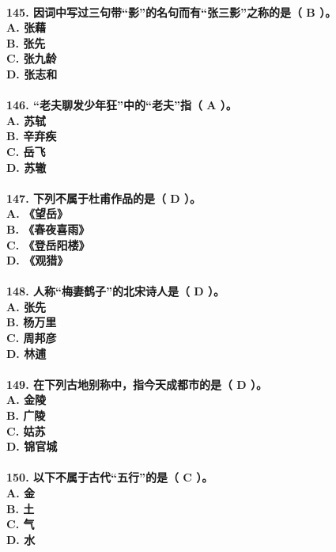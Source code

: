 \documentclass[UTF8]{ctexart} %
\begin{document}
\paragraph{
145. 因词中写过三句带“影”的名句而有“张三影”之称的是（ \color{red}B\color{black} ）。 \\
    A. 张藉 \\
    B. 张先 \\
    C. 张九龄 \\
    D. 张志和
}
\paragraph{
146. “老夫聊发少年狂”中的“老夫”指（ \color{red}A\color{black} ）。 \\
    A. 苏轼 \\
    B. 辛弃疾 \\
    C. 岳飞 \\
    D. 苏辙
}
\paragraph{
147. 下列不属于杜甫作品的是（ \color{red}D\color{black} ）。 \\
    A. 《望岳》 \\
    B. 《春夜喜雨》 \\
    C. 《登岳阳楼》 \\
    D. 《观猎》
}
\paragraph{
148. 人称“梅妻鹤子”的北宋诗人是（ \color{red}D\color{black} ）。 \\
    A. 张先 \\
    B. 杨万里 \\
    C. 周邦彦 \\
    D. 林逋
}
\paragraph{
149. 在下列古地别称中，指今天成都市的是（ \color{red}D\color{black} ）。 \\
    A. 金陵 \\
    B. 广陵 \\
    C. 姑苏 \\
    D. 锦官城
}
\paragraph{
150. 以下不属于古代“五行”的是（ \color{red}C\color{black} ）。 \\
    A. 金 \\
    B. 土 \\
    C. 气 \\
    D. 水
}
\newpage
\end{document}
